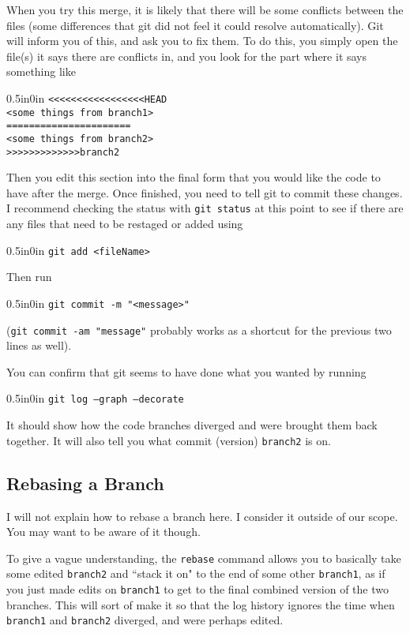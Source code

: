 \documentclass[11pt]{article}
\newcommand{\code}[1]{\begin{adjustwidth}{0.5in}{0in}
    \texttt{#1}
    \end{adjustwidth}}
\begin{document}
When you try this merge, it is likely that there will be some conflicts between the files (some differences that git did not feel it could resolve automatically).  Git will inform you of this, and ask you to fix them.  To do this, you simply open the file(s) it says there are conflicts in, and you look for the part where it says something like

\code{<<<<<<<<<<<<<<<<<HEAD\\
<some things from branch1>\\
======================\\
<some things from branch2>\\
>>>>>>>>>>>>>branch2}

Then you edit this section into the final form that you would like the code to have after the merge.  Once finished, you need to tell git to commit these changes.  I recommend checking the status with \texttt{git status} at this point to see if there are any files that need to be restaged or added using 
\code{git add <fileName>} 

Then run

\code{git commit -m "<message>"}

(\texttt{git commit -am "message"} probably works as a shortcut for the previous two lines as well).  

You can confirm that git seems to have done what you wanted by running 

\code{git log --graph --decorate}

It should show how the code branches diverged and were brought them back together.  It will also tell you what commit (version) \texttt{branch2} is on.

\subsection{Rebasing a Branch}

I will not explain how to rebase a branch here.  I consider it outside of our scope.  You may want to be aware of it though.

To give a vague understanding, the \texttt{rebase} command allows you to basically take some edited \texttt{branch2} and ``stack it on" to the end of some other \texttt{branch1}, as if you just made edits on \texttt{branch1} to get to the final combined version of the two branches.  This will sort of make it so that the log history ignores the time when \texttt{branch1} and \texttt{branch2} diverged, and were perhaps edited.
\end{document}

